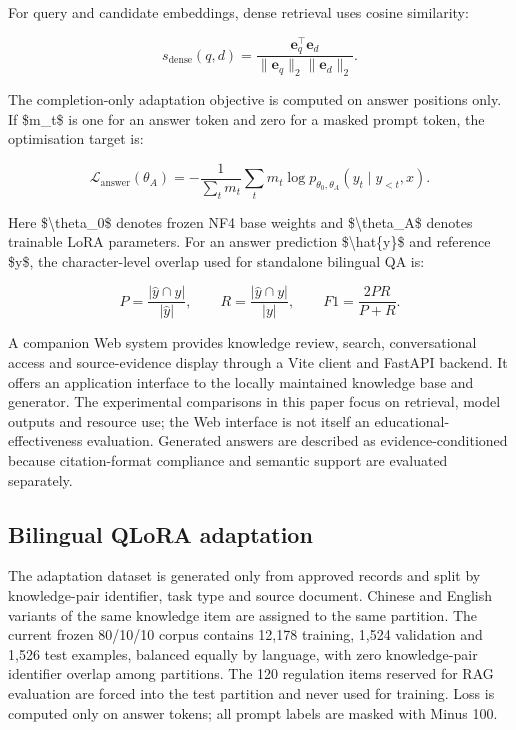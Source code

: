 For query and candidate embeddings, dense retrieval uses cosine similarity:

\begin{equation}
s_{\mathrm{dense}}(q,d)=\frac{\mathbf{e}_q^{\top}\mathbf{e}_d}{\lVert\mathbf{e}_q\rVert_2\lVert\mathbf{e}_d\rVert_2}.
\end{equation}

The completion-only adaptation objective is computed on answer positions only. If \$m\_t\$ is one for an answer token and zero for a masked prompt token, the optimisation target is:

\begin{equation}
\mathcal{L}_{\mathrm{answer}}(\theta_A)=-\frac{1}{\sum_t m_t}\sum_t m_t\log p_{\theta_0,\theta_A}(y_t\mid y_{<t},x).
\end{equation}

Here \$\textbackslash{}theta\_0\$ denotes frozen NF4 base weights and \$\textbackslash{}theta\_A\$ denotes trainable LoRA parameters. For an answer prediction \$\textbackslash{}hat\{y\}\$ and reference \$y\$, the character-level overlap used for standalone bilingual QA is:

\begin{equation}
P=\frac{|\hat{y}\cap y|}{|\hat{y}|},\qquad R=\frac{|\hat{y}\cap y|}{|y|},\qquad F1=\frac{2PR}{P+R}.
\end{equation}

A companion Web system provides knowledge review, search, conversational access and source-evidence display through a Vite client and FastAPI backend. It offers an application interface to the locally maintained knowledge base and generator. The experimental comparisons in this paper focus on retrieval, model outputs and resource use; the Web interface is not itself an educational-effectiveness evaluation. Generated answers are described as evidence-conditioned because citation-format compliance and semantic support are evaluated separately.

\subsection{Bilingual QLoRA adaptation}

The adaptation dataset is generated only from approved records and split by knowledge-pair identifier, task type and source document. Chinese and English variants of the same knowledge item are assigned to the same partition. The current frozen 80/10/10 corpus contains 12,178 training, 1,524 validation and 1,526 test examples, balanced equally by language, with zero knowledge-pair identifier overlap among partitions. The 120 regulation items reserved for RAG evaluation are forced into the test partition and never used for training. Loss is computed only on answer tokens; all prompt labels are masked with Minus 100.

